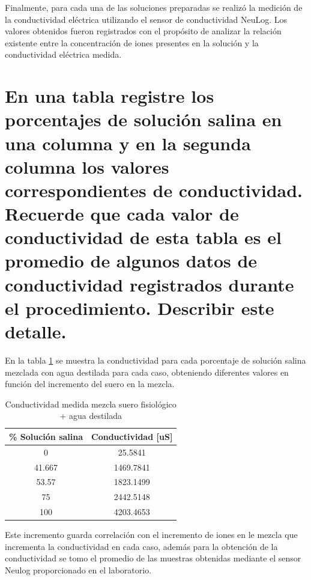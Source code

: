 \documentclass[a4paper,openany,12pt]{book}
\begin{document}
Finalmente, para cada una de las soluciones preparadas se realizó la medición de
la conductividad eléctrica utilizando el sensor de conductividad NeuLog. Los
valores obtenidos fueron registrados con el propósito de analizar la relación
existente entre la concentración de iones presentes en la solución y la
conductividad eléctrica medida.



\section{En una tabla registre los porcentajes de solución salina en una columna y en la segunda columna los valores correspondientes de conductividad. Recuerde que cada valor de conductividad de esta tabla es el promedio de algunos datos de conductividad registrados durante el procedimiento. Describir este detalle.}

En la tabla \ref{tab:conductividad-mezclas} se muestra la conductividad para cada porcentaje de solución salina mezclada con agua destilada para cada caso, obteniendo diferentes valores en función del incremento del suero en la mezcla.

\begin{table}[h]
	\centering
	\begin{tabular}{|c|c|}
		\hline
		\textbf{\% Solución salina} & \textbf{Conductividad {[}uS{]}} \\ \hline
		0                           & 25.5841                         \\ \hline
		41.667                      & 1469.7841                       \\ \hline
		53.57                       & 1823.1499                       \\ \hline
		75                          & 2442.5148                       \\ \hline
		100                         & 4203.4653                       \\ \hline
	\end{tabular}
	\caption{Conductividad medida mezcla suero fisiológico + agua destilada}
	\label{tab:conductividad-mezclas}
\end{table}

Este incremento guarda correlación con el incremento de iones en le mezcla que incrementa la conductividad en cada caso, además para la obtención de la conductividad se tomo el promedio de las muestras obtenidas mediante el sensor Neulog proporcionado en el laboratorio.
\end{document}

